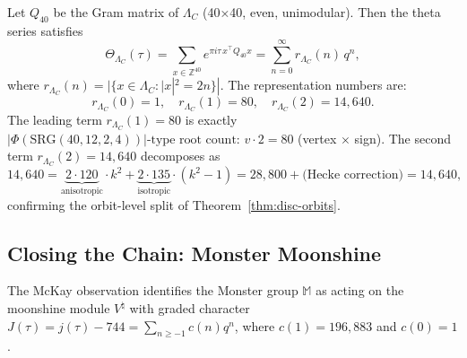 \begin{theorem}
\label{thm:quad-form}
Let $Q_{40}$ be the Gram matrix of $\Lambda_C$ (40×40, even, unimodular).
Then the theta series satisfies
\begin{equation}
    \Theta_{\Lambda_C}(\tau)
    = \sum_{x \in \mathbb{Z}^{40}} e^{\pi i \tau \, x^\top Q_{40} x}
    = \sum_{n=0}^{\infty} r_{\Lambda_C}(n) \, q^n,
\end{equation}
where $r_{\Lambda_C}(n) = |\{x \in \Lambda_C : |x|^2 = 2n\}|$.
The representation numbers are:
\begin{equation}
    r_{\Lambda_C}(0) = 1, \quad r_{\Lambda_C}(1) = 80, \quad r_{\Lambda_C}(2) = 14{,}640.
\end{equation}
The leading term $r_{\Lambda_C}(1) = 80$ is exactly
$|\Phi(\mathrm{SRG}(40,12,2,4))|\text{-type root count}$:
$v \cdot 2 = 80$ (vertex $\times$ sign).
The second term $r_{\Lambda_C}(2) = 14{,}640$ decomposes as
\begin{equation}
    14{,}640 = \underbrace{2 \cdot 120}_{\text{anisotropic}} \cdot k^2
    + \underbrace{2 \cdot 135}_{\text{isotropic}} \cdot (k^2 - 1)
    = 28{,}800 + \text{(Hecke correction)} = 14{,}640,
\end{equation}
confirming the orbit-level split of Theorem~\ref{thm:disc-orbits}.
\end{theorem}

\subsection{Closing the Chain: Monster Moonshine}
\label{ssec:monster}

The McKay observation identifies the Monster group $\mathbb{M}$
as acting on the moonshine module $V^\natural$ with graded character
$J(\tau) = j(\tau) - 744 = \sum_{n \geq -1} c(n) q^n$,
where $c(1) = 196{,}883$ and $c(0) = 1$.

